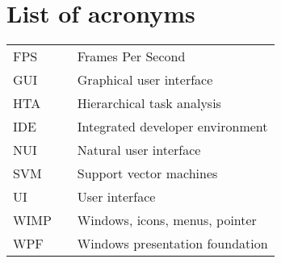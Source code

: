 \chapter*{List of acronyms}

\setlength{\LTleft}{0pt}
\begin{longtable}{lll}
FPS & \phantom{xxxxxxx} & Frames Per Second\\
GUI	& \phantom{xxxxxxx} & Graphical user interface\\
HTA	& \phantom{xxxxxxx} & Hierarchical task analysis\\
IDE & \phantom{xxxxxxx} & Integrated developer environment\\
NUI & \phantom{xxxxxxx} & Natural user interface\\
SVM	& \phantom{xxxxxxx} & Support vector machines\\
UI  & \phantom{xxxxxxx} & User interface\\
WIMP & \phantom{xxxxxxx} & Windows, icons, menus, pointer\\
WPF & \phantom{xxxxxxx} & Windows presentation foundation
\end{longtable}